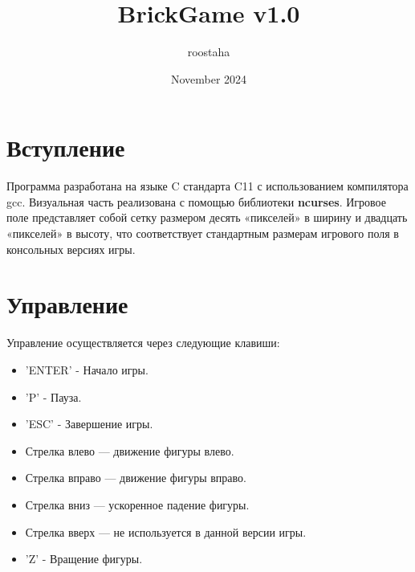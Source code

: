 \documentclass{article}
\title{BrickGame v1.0}
\author{roostaha}
\date{November 2024}
\begin{document}
\maketitle

\section{Вступление}
Программа разработана на языке C стандарта C11 с использованием компилятора gcc. Визуальная часть реализована с помощью библиотеки \textbf{ncurses}. Игровое поле представляет собой сетку размером десять «пикселей» в ширину и двадцать «пикселей» в высоту, что соответствует стандартным размерам игрового поля в консольных версиях игры.

\section{Управление}
Управление осуществляется через следующие клавиши:
\begin{itemize}
    \item 'ENTER' - Начало игры.
    \item 'P' - Пауза.
    \item 'ESC' - Завершение игры.
    \item Стрелка влево — движение фигуры влево.
    \item Стрелка вправо — движение фигуры вправо.
    \item Стрелка вниз — ускоренное падение фигуры.
    \item Стрелка вверх — не используется в данной версии игры.
    \item 'Z' - Вращение фигуры.
\end{itemize}
\end{document}
